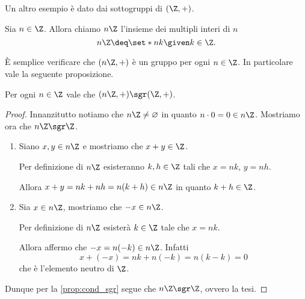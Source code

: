 Un altro esempio è dato dai sottogruppi di $(\Z, +)$.

\begin{definition}
    Sia $n \in \Z$. Allora chiamo $n\Z$ l'insieme dei multipli interi di $n$ \[
         n\Z \deq \set*{nk \given k \in \Z}.
    \]
\end{definition}

È semplice verificare che $(n\Z, +)$ è un gruppo per ogni $n \in \Z$. In particolare vale la seguente proposizione.

\begin{proposition}
    [$n\Z$ è sottogruppo di $\Z$] \label{prop:nZ_sgr_Z}
    Per ogni $n \in \Z$ vale che $(n\Z, +) \sgr (\Z, +)$.
\end{proposition}
\begin{proof}
    Innanzitutto notiamo che $n\Z \neq \varnothing$ in quanto $n \cdot 0 = 0 \in n\Z$.     
    Mostriamo ora che $n\Z \sgr \Z$.
    \begin{enumerate}[label={(\arabic*)}]
        \item Siano $x, y \in n\Z$ e mostriamo che $x+y \in \Z$. 
        
        Per definizione di $n\Z$ esisteranno $k, h \in \Z$ tali che $x = nk$, $y = nh$.
        
        Allora $x + y = nk + nh = n(k + h) \in n\Z$ in quanto $k + h \in \Z$.
        \item Sia $x \in n\Z$, mostriamo che $-x \in n\Z$.
        
        Per definizione di $n\Z$ esisterà $k \in \Z$ tale che $x = nk$.

        Allora affermo che $-x = n(-k) \in n\Z$. Infatti \[
            x + (-x) = nk + n(-k) = n(k - k) = 0    
        \] che è l'elemento neutro di $\Z$.
    \end{enumerate}

    Dunque per la \autoref{prop:cond_sgr} segue che $n\Z \sgr \Z$, ovvero la tesi.
\end{proof}

